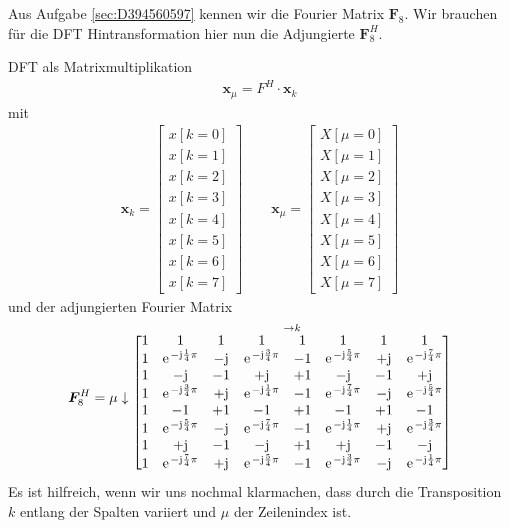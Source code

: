 \begin{Werkzeug}
Aus Aufgabe \ref{sec:D394560597} kennen wir die Fourier Matrix $\bm{F}_8$.
Wir brauchen für die DFT Hintransformation hier nun die Adjungierte $\bm{F}^H_8$.
\end{Werkzeug}
\begin{Ansatz}
DFT als Matrixmultiplikation
\begin{align}
\bm{x}_\mu = F^H \cdot \bm{x}_k
\end{align}
mit
\begin{align}
%
\bm{x}_k =
\begin{bmatrix}
x[k=0]\\x[k=1]\\x[k=2]\\x[k=3]\\x[k=4]\\x[k=5]\\x[k=6]\\x[k=7]
\end{bmatrix}
%
\qquad
%
\bm{x}_\mu =
\begin{bmatrix}
X[\mu=0]\\X[\mu=1]\\X[\mu=2]\\X[\mu=3]\\X[\mu=4]\\X[\mu=5]\\X[\mu=6]\\X[\mu=7]
\end{bmatrix}
%
\end{align}
und der adjungierten Fourier Matrix
\begin{align}
\bm{F}^H_8 =
\mu \downarrow
\substack{\rightarrow k\\
\begin{bmatrix}
1 & 1 & 1 & 1 & 1 & 1 & 1 & 1\\
1 & \e^{-\im\frac{1}{4}\pi} & -\im & \e^{-\im\frac{3}{4}\pi} & -1 & \e^{-\im\frac{5}{4}\pi} & +\im & \e^{-\im\frac{7}{4}\pi}\\
1 & -\im & -1 & +\im & +1 & -\im & -1 & +\im\\
1 & \e^{-\im\frac{3}{4}\pi} & +\im & \e^{-\im\frac{1}{4}\pi} & -1 & \e^{-\im\frac{7}{4}\pi} & -\im & \e^{-\im\frac{5}{4}\pi}\\
1 & -1 & +1 & -1 & +1 & -1 & +1 & -1\\
1 & \e^{-\im\frac{5}{4}\pi} & -\im & \e^{-\im\frac{7}{4}\pi} & -1 & \e^{-\im\frac{1}{4}\pi} & +\im & \e^{-\im\frac{3}{4}\pi}\\
1 & +\im & -1 & -\im & +1 & +\im & -1 & -\im\\
1 & \e^{-\im\frac{7}{4}\pi} & +\im & \e^{-\im\frac{5}{4}\pi} & -1 & \e^{-\im\frac{3}{4}\pi} & -\im & \e^{-\im\frac{1}{4}\pi}\\
\end{bmatrix}
}
%
\end{align}
Es ist hilfreich, wenn wir uns nochmal klarmachen, dass durch die Transposition
$k$ entlang der Spalten variiert und $\mu$ der Zeilenindex ist.

\end{Ansatz}
